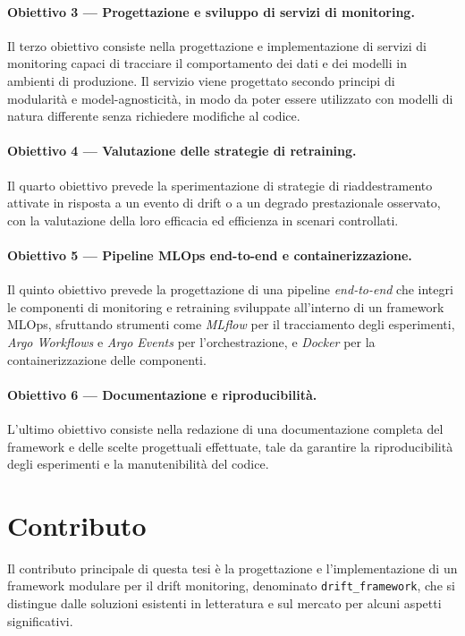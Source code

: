 \paragraph{Obiettivo 3 — Progettazione e sviluppo di servizi di monitoring.}
Il terzo obiettivo consiste nella progettazione e implementazione di servizi
di monitoring capaci di tracciare il comportamento dei dati e dei modelli in
ambienti di produzione. Il servizio viene progettato secondo principi di
modularità e model-agnosticità, in modo da poter essere utilizzato con modelli
di natura differente senza richiedere modifiche al codice.

\paragraph{Obiettivo 4 — Valutazione delle strategie di retraining.}
Il quarto obiettivo prevede la sperimentazione di strategie di riaddestramento
attivate in risposta a un evento di drift o a un degrado prestazionale
osservato, con la valutazione della loro efficacia ed efficienza in scenari
controllati.

\paragraph{Obiettivo 5 — Pipeline MLOps end-to-end e containerizzazione.}
Il quinto obiettivo prevede la progettazione di una pipeline
\textit{end-to-end} che integri le componenti di monitoring e retraining
sviluppate all'interno di un framework MLOps, sfruttando strumenti come
\textit{MLflow} per il tracciamento degli esperimenti, \textit{Argo Workflows}
e \textit{Argo Events} per l'orchestrazione, e \textit{Docker} per la
containerizzazione delle componenti.

\paragraph{Obiettivo 6 — Documentazione e riproducibilità.}
L'ultimo obiettivo consiste nella redazione di una documentazione completa del
framework e delle scelte progettuali effettuate, tale da garantire la
riproducibilità degli esperimenti e la manutenibilità del codice.


\section{Contributo}
\label{sec:contributo}

Il contributo principale di questa tesi è la progettazione e l'implementazione
di un framework modulare per il drift monitoring, denominato
\texttt{drift\_framework}, che si distingue dalle soluzioni esistenti in
letteratura e sul mercato per alcuni aspetti significativi.


